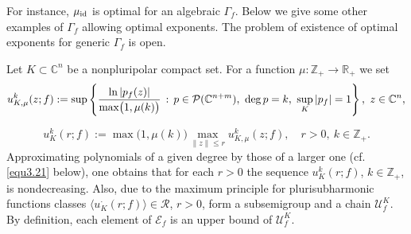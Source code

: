 \documentclass[11pt, oneside]{amsart}
\begin{document}
For instance, $\mu_{{\rm id}}$ is optimal for an algebraic $\Gamma_f$. Below we give some other examples of $\Gamma_f$ allowing optimal exponents. The problem of existence of optimal exponents for generic $\Gamma_f$ is open. \smallskip

Let $K\subset\mathbb C^n$ be a nonpluripolar compact set. For  a function $\mu:\mathbb Z_+\rightarrow\mathbb R_+$
we set
\[
u_{K,\mu}^k(z;f):=\sup\left\{\frac{\ln |p_f(z)|}{\max\bigl(1,\mu(k)\bigr)}\, :\, p\in\mathcal P(\mathbb C^{n+m}),\ {\rm deg}\,p= k,\ \sup_{K}|p_f|=1\right\},\  z\in\mathbb C^n,
\]

\[
 u_K^k(r;f):=\max\bigl(1,\mu(k)\bigr)\max_{\|z\|\le r}u_{K,\mu}^k(z;f),\quad r>0,\  k\in\mathbb Z_+.
\]
Approximating polynomials of a given degree by those of a larger one (cf. \eqref{equ3.21} below), one obtains that for each $r>0$ the sequence $u_{K}^k(r;f)$, $k\in\mathbb Z_+$, is nondecreasing. Also, due to the maximum principle for plurisubharmonic functions classes $\bigl\langle u_K^{\cdot}(r;f)\bigr\rangle\in\mathscr R$, $r>0$, form a subsemigroup and a chain $\mathscr U_f^K$. By definition, each element of $\mathscr E_f$ is an upper bound of $\mathscr U_f^K$.
\end{document}

